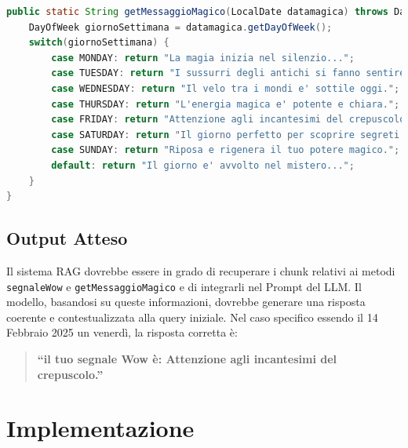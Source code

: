 \documentclass[12pt,a4paper,openright,twoside]{book}
\begin{document}
\begin{lstlisting}[language=Java, caption={Metodo getMessaggioMagico in DateUtilCustom.java}, label={lst:getMessaggioMagico}]
public static String getMessaggioMagico(LocalDate datamagica) throws DateTimeParseException {
    DayOfWeek giornoSettimana = datamagica.getDayOfWeek();
    switch(giornoSettimana) {
        case MONDAY: return "La magia inizia nel silenzio...";
        case TUESDAY: return "I sussurri degli antichi si fanno sentire.";
        case WEDNESDAY: return "Il velo tra i mondi e' sottile oggi.";
        case THURSDAY: return "L'energia magica e' potente e chiara.";
        case FRIDAY: return "Attenzione agli incantesimi del crepuscolo.";
        case SATURDAY: return "Il giorno perfetto per scoprire segreti nascosti.";
        case SUNDAY: return "Riposa e rigenera il tuo potere magico.";
        default: return "Il giorno e' avvolto nel mistero...";
    }
}
\end{lstlisting}

\subsection{Output Atteso}
Il sistema RAG dovrebbe essere in grado di recuperare i chunk relativi ai metodi \texttt{segnaleWow} e \texttt{getMessaggioMagico} e di integrarli nel Prompt del LLM.
Il modello, basandosi su queste informazioni, dovrebbe generare una risposta coerente e contestualizzata alla query iniziale.
Nel caso specifico essendo il 14 Febbraio 2025 un venerdì,  la risposta corretta è:
\begin{quote}
    \textbf{``il tuo segnale Wow è: Attenzione agli incantesimi del crepuscolo.''}
\end{quote}

\section{Implementazione}
\end{document}
